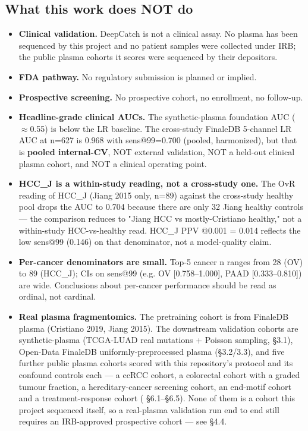 \documentclass[11pt]{article}
\begin{document}
\subsection{What this work does NOT do}
\begin{itemize}
\item
\textbf{Clinical validation.} DeepCatch is not a clinical assay. No plasma has been sequenced by this project and no patient samples were collected under IRB; the public plasma cohorts it scores were sequenced by their depositors.
\item
\textbf{FDA pathway.} No regulatory submission is planned or implied.
\item
\textbf{Prospective screening.} No prospective cohort, no enrollment, no follow-up.
\item
\textbf{Headline-grade clinical AUCs.} The synthetic-plasma foundation AUC ($\approx$0.55) is below the LR baseline. The cross-study FinaleDB 5-channel LR AUC at n=\allowbreak{}627 is 0.968 with sens@99=\allowbreak{}0.700 (pooled, harmonized), but that is \textbf{pooled internal-CV}, NOT external validation, NOT a held-out clinical plasma cohort, and NOT a clinical operating point.
\item
\textbf{HCC\_J is a within-study reading, not a cross-study one.} The OvR reading of HCC\_J (Jiang 2015 only, n=\allowbreak{}89) against the cross-study healthy pool drops the AUC to 0.704 because there are only 32 Jiang healthy controls --- the comparison reduces to "Jiang HCC vs mostly-Cristiano healthy," not a within-study HCC-vs-healthy read. HCC\_J PPV @0.001 =\allowbreak{} 0.014 reflects the low sens@99 (0.146) on that denominator, not a model-quality claim.
\item
\textbf{Per-cancer denominators are small.} Top-5 cancer n ranges from 28 (OV) to 89 (HCC\_J); CIs on sens@99 (e.g. OV [0.758--1.000], PAAD [0.333--0.810]) are wide. Conclusions about per-cancer performance should be read as ordinal, not cardinal.
\item
\textbf{Real plasma fragmentomics.} The pretraining cohort is from FinaleDB plasma (Cristiano 2019, Jiang 2015). The downstream validation cohorts are synthetic-plasma (TCGA-LUAD real mutations + Poisson sampling, \S{}3.1), Open-Data FinaleDB uniformly-preprocessed plasma (\S{}3.2/3.3), and five further public plasma cohorts scored with this repository's protocol and its confound controls each --- a ccRCC cohort, a colorectal cohort with a graded tumour fraction, a hereditary-cancer screening cohort, an end-motif cohort and a treatment-response cohort ( \S{}6.1--\S{}6.5). None of them is a cohort this project sequenced itself, so a real-plasma validation run end to end still requires an IRB-approved prospective cohort --- see \S{}4.4.
\end{itemize}
\end{document}
